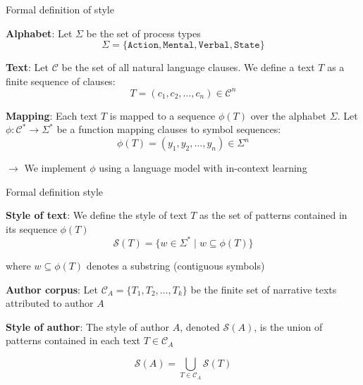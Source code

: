 \documentclass[handout,10pt]{beamer}
\begin{document}
\begin{frame}{Formal definition of style}

\textbf{Alphabet}: Let $\Sigma$ be the set of process types
$$ \Sigma = \{ \texttt{Action}, \texttt{Mental}, \texttt{Verbal}, \texttt{State}\} $$

\vspace{0.2cm}
\pause

\textbf{Text}: Let $\mathcal{C}$ be the set of all natural language clauses. We define a text $T$ as a finite sequence of clauses:
$$ T = (c_1, c_2, \dots, c_n) \in \mathcal{C}^n $$

\vspace{0.2cm}
\pause

\textbf{Mapping}: Each text $T$ is mapped to a sequence $\phi(T)$ over the alphabet $\Sigma$. Let $\phi: \mathcal{C}^* \to \Sigma^*$ be a function mapping clauses to symbol sequences:
$$ \phi(T) = (y_1, y_2, \dots, y_n) \in \Sigma^n $$

\vspace{0.3cm}
\pause
\raggedright
\normalsize

$\rightarrow$ We implement $\phi$ using a language model with in-context learning

\end{frame}


\begin{frame}{Formal definition style}

\textbf{Style of text}: We define the style of text $T$ as the set of patterns contained in its sequence $\phi(T)$
$$ \mathcal{S}(T) = \{ w \in \Sigma^* \mid w \subseteq \phi(T) \} $$

\vspace{0.1cm}
\centering
\small
where $w \subseteq \phi(T)$ denotes a substring (contiguous symbols)

\vspace{0.5cm}
\pause
\normalsize
\raggedright

\textbf{Author corpus}: Let $\mathcal{C}_A = \{T_1, T_2, \dots, T_k\}$ be the finite set of narrative texts attributed to author $A$

\vspace{0.5cm}
\pause

\textbf{Style of author}: The style of author $A$, denoted $\mathcal{S}(A)$, is the union of patterns contained in each text $T \in \mathcal{C}_A$

\vspace{0.15cm}

$$ \mathcal{S}(A) = \bigcup_{T \in \mathcal{C}_A} \mathcal{S}(T) $$

\end{frame}
\end{document}
